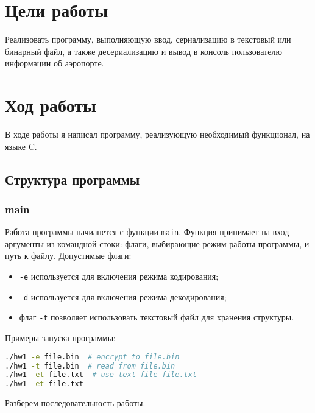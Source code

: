 \section{Цели работы}
Реализовать программу, выполняющую ввод, сериализацию в текстовый или бинарный файл, а также десериализацию и вывод в консоль пользователю информации об аэропорте.



\section{Ход работы}
В ходе работы я написал программу, реализующую необходимый функционал, на языке C.
\subsection{Структура программы}
\subsubsection{main}
Работа программы начианется с функции \texttt{main}. Функция принимает на вход аргументы из командной стоки: флаги, выбирающие режим работы программы, и путь к файлу. Допустимые флаги:

\begin{itemize}
    \item \verb|-e| используется для включения режима кодирования;
    \item \verb|-d| используется для включения режима декодирования;
    \item флаг \verb|-t| позволяет использовать текстовый файл для хранения структуры.
\end{itemize}

Примеры запуска программы:
\begin{lstlisting}[language=bash, numbers=none]
./hw1 -e file.bin  # encrypt to file.bin
./hw1 -t file.bin  # read from file.bin
./hw1 -et file.txt  # use text file file.txt
./hw1 -et file.txt
\end{lstlisting}

Разберем последовательность работы.

